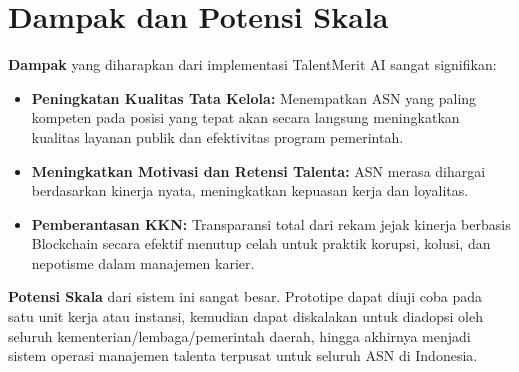 \documentclass[11pt, a4paper]{article}
\begin{document}
\section{Dampak dan Potensi Skala}
\textbf{Dampak} yang diharapkan dari implementasi TalentMerit AI sangat signifikan:
\begin{itemize}
    \item \textbf{Peningkatan Kualitas Tata Kelola:} Menempatkan ASN yang paling kompeten pada posisi yang tepat akan secara langsung meningkatkan kualitas layanan publik dan efektivitas program pemerintah.
    \item \textbf{Meningkatkan Motivasi dan Retensi Talenta:} ASN merasa dihargai berdasarkan kinerja nyata, meningkatkan kepuasan kerja dan loyalitas.
    \item \textbf{Pemberantasan KKN:} Transparansi total dari rekam jejak kinerja berbasis Blockchain secara efektif menutup celah untuk praktik korupsi, kolusi, dan nepotisme dalam manajemen karier.
\end{itemize}
\textbf{Potensi Skala} dari sistem ini sangat besar. Prototipe dapat diuji coba pada satu unit kerja atau instansi, kemudian dapat diskalakan untuk diadopsi oleh seluruh kementerian/lembaga/pemerintah daerah, hingga akhirnya menjadi sistem operasi manajemen talenta terpusat untuk seluruh ASN di Indonesia.

\end{document}
